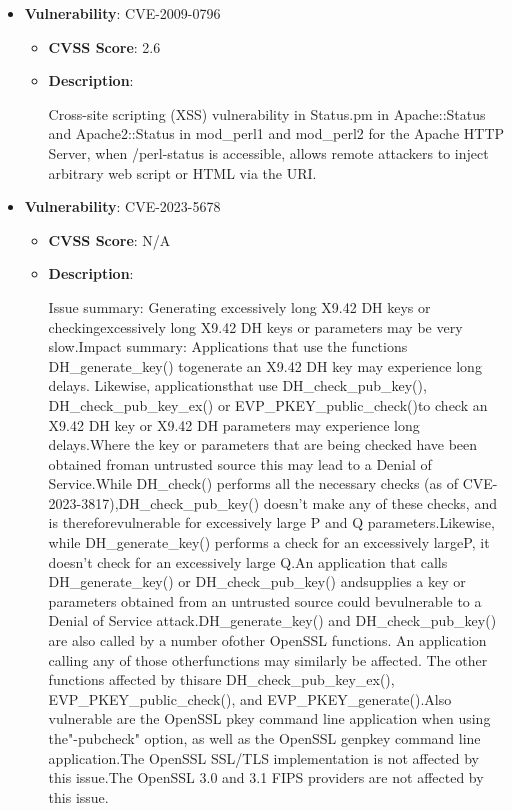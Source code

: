 \documentclass{article}
\begin{document}
\begin{itemize}
        \item \textbf{Vulnerability}: CVE-2009-0796
        \begin{itemize}
            \item \textbf{CVSS Score}:  2.6 
            \item \textbf{Description}:
            \parbox[t]{0.9\linewidth}{
                \ttfamily Cross-site scripting (XSS) vulnerability in Status.pm in Apache::Status and Apache2::Status in mod\_perl1 and mod\_perl2 for the Apache HTTP Server, when /perl-status is accessible, allows remote attackers to inject arbitrary web script or HTML via the URI.
            }
        \end{itemize}
    
        \item \textbf{Vulnerability}: CVE-2023-5678
        \begin{itemize}
            \item \textbf{CVSS Score}:  N/A 
            \item \textbf{Description}:
            \parbox[t]{0.9\linewidth}{
                \ttfamily Issue summary: Generating excessively long X9.42 DH keys or checkingexcessively long X9.42 DH keys or parameters may be very slow.Impact summary: Applications that use the functions DH\_generate\_key() togenerate an X9.42 DH key may experience long delays.  Likewise, applicationsthat use DH\_check\_pub\_key(), DH\_check\_pub\_key\_ex() or EVP\_PKEY\_public\_check()to check an X9.42 DH key or X9.42 DH parameters may experience long delays.Where the key or parameters that are being checked have been obtained froman untrusted source this may lead to a Denial of Service.While DH\_check() performs all the necessary checks (as of CVE-2023-3817),DH\_check\_pub\_key() doesn't make any of these checks, and is thereforevulnerable for excessively large P and Q parameters.Likewise, while DH\_generate\_key() performs a check for an excessively largeP, it doesn't check for an excessively large Q.An application that calls DH\_generate\_key() or DH\_check\_pub\_key() andsupplies a key or parameters obtained from an untrusted source could bevulnerable to a Denial of Service attack.DH\_generate\_key() and DH\_check\_pub\_key() are also called by a number ofother OpenSSL functions.  An application calling any of those otherfunctions may similarly be affected.  The other functions affected by thisare DH\_check\_pub\_key\_ex(), EVP\_PKEY\_public\_check(), and EVP\_PKEY\_generate().Also vulnerable are the OpenSSL pkey command line application when using the"-pubcheck" option, as well as the OpenSSL genpkey command line application.The OpenSSL SSL/TLS implementation is not affected by this issue.The OpenSSL 3.0 and 3.1 FIPS providers are not affected by this issue.
            }
        \end{itemize}
    

\end{itemize}
\end{document}
